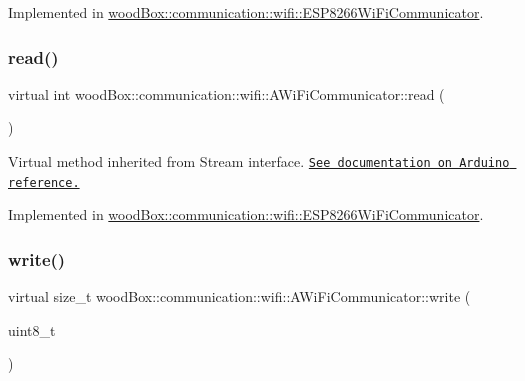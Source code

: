 Implemented in \mbox{\hyperlink{classwood_box_1_1communication_1_1wifi_1_1_e_s_p8266_wi_fi_communicator_accc6832fa7351cb977b9e3a805dc8107}{wood\+Box\+::communication\+::wifi\+::\+E\+S\+P8266\+Wi\+Fi\+Communicator}}.

\mbox{\label{classwood_box_1_1communication_1_1wifi_1_1_a_wi_fi_communicator_af4bc1adc96c124e769eb8c54d76476cf}} 
\subsubsection{\texorpdfstring{read()}{read()}}
{\footnotesize\ttfamily virtual int wood\+Box\+::communication\+::wifi\+::\+A\+Wi\+Fi\+Communicator\+::read (\begin{DoxyParamCaption}{ }\end{DoxyParamCaption})\hspace{0.3cm}{\ttfamily [pure virtual]}}

Virtual method inherited from Stream interface. \href{https://www.arduino.cc/reference/en/language/functions/communication/stream/streamread/}{\tt See documentation on Arduino reference.} 

Implemented in \mbox{\hyperlink{classwood_box_1_1communication_1_1wifi_1_1_e_s_p8266_wi_fi_communicator_a3bd1c8f72256e92c6dbdab9272fd3543}{wood\+Box\+::communication\+::wifi\+::\+E\+S\+P8266\+Wi\+Fi\+Communicator}}.

\mbox{\label{classwood_box_1_1communication_1_1wifi_1_1_a_wi_fi_communicator_a7c40345fe59737b83bfee33ecb7be013}} 
\subsubsection{\texorpdfstring{write()}{write()}}
{\footnotesize\ttfamily virtual size\+\_\+t wood\+Box\+::communication\+::wifi\+::\+A\+Wi\+Fi\+Communicator\+::write (\begin{DoxyParamCaption}\item[{uint8\+\_\+t}]{ }\end{DoxyParamCaption})\hspace{0.3cm}{\ttfamily [pure virtual]}}

